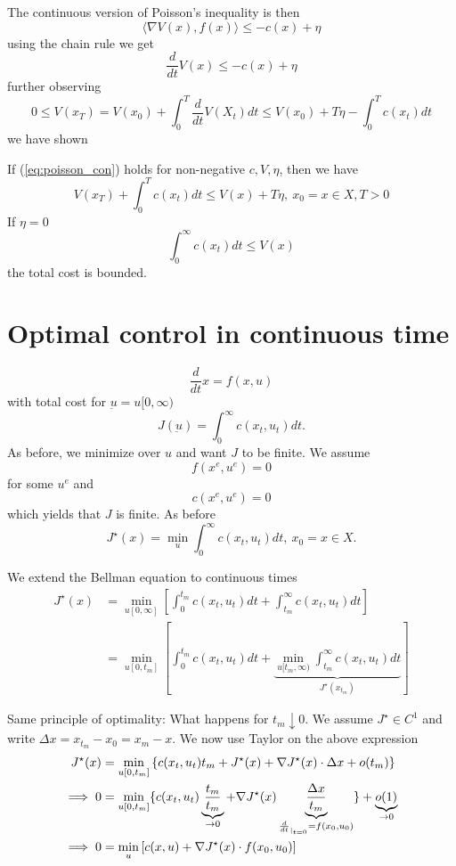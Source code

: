 The continuous version of Poisson's inequality is then 
\begin{equation}\label{eq:poisson_con}
    \langle \nabla V(x),f(x) \rangle \leq -c(x)+\eta
\end{equation}
using the chain rule we get 
\[\frac{d}{dt} V(x)\leq -c(x)+\eta \]
further observing \[0\leq V(x_T)=V(x_0)+\int_0^T \frac{d}{dt}V(X_t)dt\leq V(x_0)+T\eta-\int_0^T c(x_t)dt\]
we have shown
\begin{proposition}\label{prop:1.22}
    If (\ref{eq:poisson_con}) holds for non-negative \(c,V,\eta\), then we have 
    \begin{equation}\label{eq:comp_thm_cont}
        V(x_T)+\int_0^Tc(x_t)dt\leq V(x)+T\eta, \ x_0=x\in X,T>0 
    \end{equation}
    If \(\eta=0\)
    \[\int_0^\infty c(x_t)dt\leq V(x)\]
    the total cost is bounded.
\end{proposition}

\section{Optimal control in continuous time} 

\[\frac{d}{dt}x=f(x,u)\]
with total cost for \(\underbar{u}=u[0,\infty)\)
\[J(\underbar{u})=\int_0^\infty c(x_t,u_t)dt.\]
As before, we minimize over \(u\) and want \(J\) to be finite.
We assume \[f(x^e,u^e)=0\] for some \(u^e\) and 
\[c(x^e,u^e)=0\]
which yields that \(J\) is finite. As before 
\[J^\star(x)=\min_u \int_0^\infty c(x_t,u_t)dt,\ x_0=x\in X.\]

We extend the Bellman equation to continuous times 
\begin{align*}
    J^\star(x)&=\min_{u[0,\infty]}\left[\int_0^{t_m} c(x_t,u_t)dt+\int_{t_m}^\infty c(x_t,u_t)dt\right]\\ %
    &= \min_{u[0,t_m]}\left[\int_0^{t_m} c(x_t,u_t)dt+\underbrace{\min_{u[t_m,\infty)}\int_{t_m}^\infty c(x_t,u_t)dt}_{J^\star(x_{t_m})}\right]
\end{align*}

Same principle of optimality: What happens for \(t_m\downarrow 0\). We assume 
\(J^\star\in C^1\)
and write \(\Delta x=x_{t_m}-x_0=x_m-x\). We now use Taylor on the above expression 
\begin{align*}
    J^\star(x)&= \min_{u[0,t_m]}\left\{c(x_t,u_t)t_m+J^\star(x)+\nabla J^\star(x)\cdot \Delta x + o(t_m)  \right\}\\
    \implies 0&=\min_{u[0,t_m]}\{c(x_t,u_t)\underbrace{\frac{t_m}{t_m}}_{\to 0}+\nabla J^\star(x)\underbrace{\frac{\Delta x}{t_m}}_{\frac{d}{dt}_{|_{t=0}}=f(x_0,u_0)}\} + \underbrace{o(1)}_{\to 0} \\
    \implies 0&=\min_{u}\left[c(x,u)+\nabla J^\star(x)\cdot f(x_0,u_0)\right]
\end{align*}

